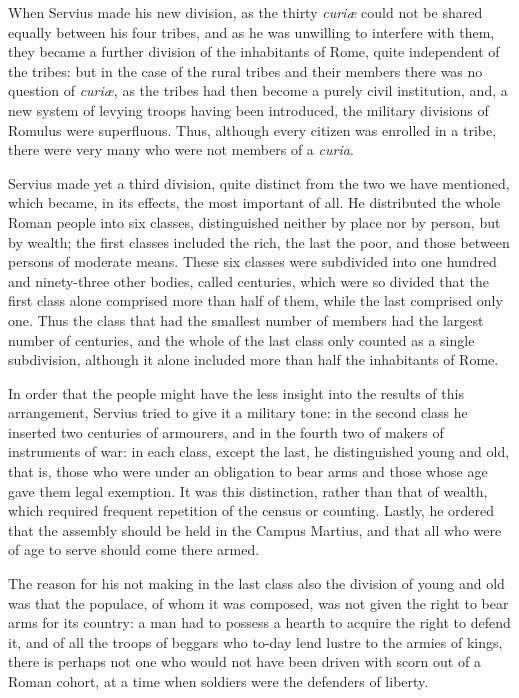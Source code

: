 \documentclass[12pt]{report}
\begin{document}
When Servius made his new division, as the thirty \textit{curiæ} could not be shared equally between his four tribes, and as he was unwilling to interfere with them, they became a further division of the inhabitants of Rome, quite independent of the tribes: but in the case of the rural tribes and their members there was no question of \textit{curiæ}, as the tribes had then become a purely civil institution, and, a new system of levying troops having been introduced, the military divisions of Romulus were superfluous. Thus, although every citizen was enrolled in a tribe, there were very many who were not members of a \textit{curia}.

Servius made yet a third division, quite distinct from the two we have mentioned, which became, in its effects, the most important of all. He distributed the whole Roman people into six classes, distinguished neither by place nor by person, but by wealth; the first classes included the rich, the last the poor, and those between persons of moderate means. These six classes were subdivided into one hundred and ninety-three other bodies, called centuries, which were so divided that the first class alone comprised more than half of them, while the last comprised only one. Thus the class that had the smallest number of members had the largest number of centuries, and the whole of the last class only counted as a single subdivision, although it alone included more than half the inhabitants of Rome.

In order that the people might have the less insight into the results of this arrangement, Servius tried to give it a military tone: in the second class he inserted two centuries of armourers, and in the fourth two of makers of instruments of war: in each class, except the last, he distinguished young and old, that is, those who were under an obligation to bear arms and those whose age gave them legal exemption. It was this distinction, rather than that of wealth, which required frequent repetition of the census or counting. Lastly, he ordered that the assembly should be held in the Campus Martius, and that all who were of age to serve should come there armed.

The reason for his not making in the last class also the division of young and old was that the populace, of whom it was composed, was not given the right to bear arms for its country: a man had to possess a hearth to acquire the right to defend it, and of all the troops of beggars who to-day lend lustre to the armies of kings, there is perhaps not one who would not have been driven with scorn out of a Roman cohort, at a time when soldiers were the defenders of liberty.
\end{document}
